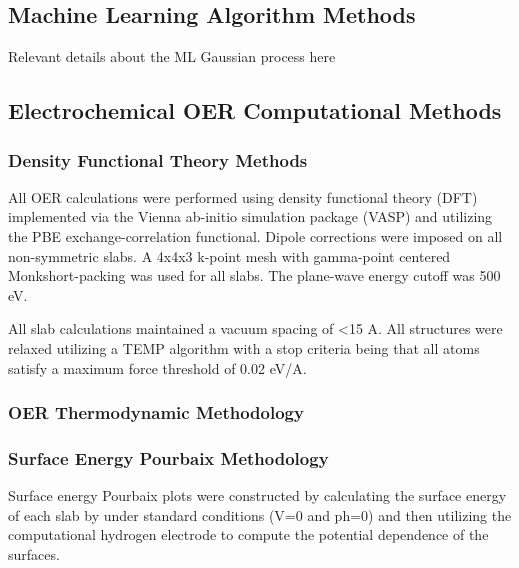 

\subsection{Machine Learning Algorithm Methods}

Relevant details about the ML Gaussian process here %

\subsection{Electrochemical OER Computational Methods}

\subsubsection{Density Functional Theory Methods}
All OER calculations were performed using density functional theory (DFT) implemented via the Vienna ab-initio simulation package (VASP) and utilizing the PBE exchange-correlation functional.
Dipole corrections were imposed on all non-symmetric slabs.
A 4x4x3 k-point mesh with gamma-point centered Monkshort-packing was used for all slabs.
The plane-wave energy cutoff was 500 eV.


All slab calculations maintained a vacuum spacing of <15 A.
All structures were relaxed utilizing a TEMP algorithm with a stop criteria being that all atoms satisfy a maximum force threshold of 0.02 eV/A.

\subsubsection{OER Thermodynamic Methodology}

\subsubsection{Surface Energy Pourbaix Methodology}
Surface energy Pourbaix plots were constructed by calculating the surface energy of each slab by under standard conditions (V=0 and ph=0) and then utilizing the computational hydrogen electrode to compute the potential dependence of the surfaces.

